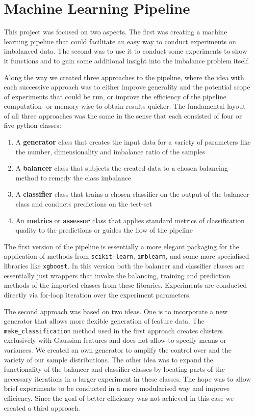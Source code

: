 
\section{Machine Learning Pipeline}

This project was focused on two aspects.
The first was creating a machine learning pipeline that could facilitate an easy way to conduct experiments on imbalanced data.
The second was to use it to conduct some experiments to show it functions and to gain some additional insight into the imbalance problem itself.

Along the way we created three approaches to the pipeline, 
where the idea with each successive approach was to either improve generality and the potential scope of experiments that could be run,
or improve the efficiency of the pipeline computation- or memory-wise to obtain results quicker.
The fundamental layout of all three approaches was the same in the sense that each consisted of four or five python classes:
\begin{enumerate}[label=\arabic*)]
\item A \textbf{generator} class that creates the input data for a variety of parameters like the number, dimensionality and imbalance ratio of the samples
\item A \textbf{balancer} class that subjects the created data to a chosen balancing method to remedy the class imbalance
\item A \textbf{classifier} class that trains a chosen classifier on the output of the balancer class and conducts predictions on the test-set
\item An \textbf{metrics} or \textbf{assessor} class that applies standard metrics of classification quality to the predictions or guides the flow of the pipeline
\end{enumerate}

The first version of the pipeline is essentially a more elegant packaging for the application of methods from \texttt{scikit-learn}, \texttt{imblearn}, 
and some more specialised libraries like \texttt{xgboost}. 
In this version both the balancer and classifier classes are essentially just wrappers that invoke the balancing, 
training and prediction methods of the imported classes from these libraries.
Experiments are conducted directly via for-loop iteration over the experiment parameters.

The second approach was based on two ideas. One is to incorporate a new generator that allows more flexible generation of feature data.
The \texttt{make\_classification} method used in the first approach creates clusters exclusively with Gaussian features and does not allow to specify means or variances.
We created an own generator to amplify the control over and the variety of our sample distributions.
The other idea was to expand the functionality of the balancer and classifier classes by locating parts of the necessary iterations in a larger experiment in these classes.
The hope was to allow brief experiments to be conducted in a more modularised way and improve efficiency.
Since the goal of better efficiency was not achieved in this case we created a third approach.

